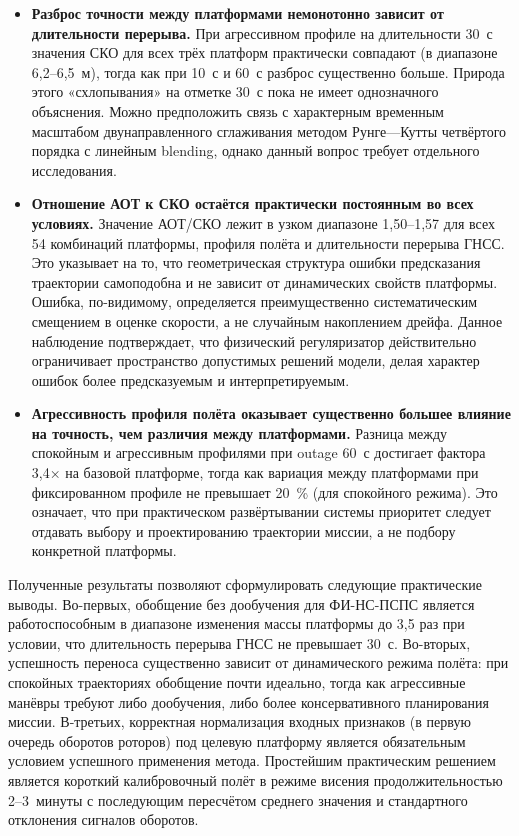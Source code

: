 \begin{itemize}
	\item \textbf{Разброс точности между платформами немонотонно зависит от длительности перерыва.}  
	При агрессивном профиле на длительности 30~с значения СКО для всех трёх платформ практически совпадают (в диапазоне 6,2–6,5~м), тогда как при 10~с и 60~с разброс существенно больше. Природа этого «схлопывания» на отметке 30~с пока не имеет однозначного объяснения. Можно предположить связь с характерным временным масштабом двунаправленного сглаживания методом Рунге—Кутты четвёртого порядка с линейным blending, однако данный вопрос требует отдельного исследования.
	
	\item \textbf{Отношение АОТ к СКО остаётся практически постоянным во всех условиях.}  
	Значение АОТ/СКО лежит в узком диапазоне 1,50–1,57 для всех 54 комбинаций платформы, профиля полёта и длительности перерыва ГНСС. Это указывает на то, что геометрическая структура ошибки предсказания траектории самоподобна и не зависит от динамических свойств платформы. Ошибка, по-видимому, определяется преимущественно систематическим смещением в оценке скорости, а не случайным накоплением дрейфа. Данное наблюдение подтверждает, что физический регуляризатор действительно ограничивает пространство допустимых решений модели, делая характер ошибок более предсказуемым и интерпретируемым.
	
	\item \textbf{Агрессивность профиля полёта оказывает существенно большее влияние на точность, чем различия между платформами.}  
	Разница между спокойным и агрессивным профилями при outage 60~с достигает фактора 3,4× на базовой платформе, тогда как вариация между платформами при фиксированном профиле не превышает 20~\% (для спокойного режима). Это означает, что при практическом развёртывании системы приоритет следует отдавать выбору и проектированию траектории миссии, а не подбору конкретной платформы.
\end{itemize}

Полученные результаты позволяют сформулировать следующие практические выводы. Во-первых, обобщение без дообучения для ФИ-НС-ПСПС является работоспособным в диапазоне изменения массы платформы до 3,5 раз при условии, что длительность перерыва ГНСС не превышает 30~с. Во-вторых, успешность переноса существенно зависит от динамического режима полёта: при спокойных траекториях обобщение почти идеально, тогда как агрессивные манёвры требуют либо дообучения, либо более консервативного планирования миссии. В-третьих, корректная нормализация входных признаков (в первую очередь оборотов роторов) под целевую платформу является обязательным условием успешного применения метода. Простейшим практическим решением является короткий калибровочный полёт в режиме висения продолжительностью 2–3~минуты с последующим пересчётом среднего значения и стандартного отклонения сигналов оборотов.

